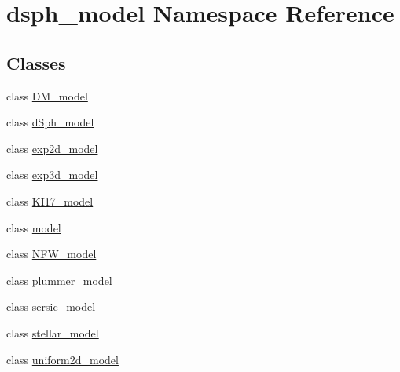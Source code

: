 \hypertarget{namespacedsph__model}{}\section{dsph\+\_\+model Namespace Reference}
\label{namespacedsph__model}
\subsection*{Classes}
\begin{DoxyCompactItemize}
\item 
class \hyperlink{classdsph__model_1_1DM__model}{D\+M\+\_\+model}
\item 
class \hyperlink{classdsph__model_1_1dSph__model}{d\+Sph\+\_\+model}
\item 
class \hyperlink{classdsph__model_1_1exp2d__model}{exp2d\+\_\+model}
\item 
class \hyperlink{classdsph__model_1_1exp3d__model}{exp3d\+\_\+model}
\item 
class \hyperlink{classdsph__model_1_1KI17__model}{K\+I17\+\_\+model}
\item 
class \hyperlink{classdsph__model_1_1model}{model}
\item 
class \hyperlink{classdsph__model_1_1NFW__model}{N\+F\+W\+\_\+model}
\item 
class \hyperlink{classdsph__model_1_1plummer__model}{plummer\+\_\+model}
\item 
class \hyperlink{classdsph__model_1_1sersic__model}{sersic\+\_\+model}
\item 
class \hyperlink{classdsph__model_1_1stellar__model}{stellar\+\_\+model}
\item 
class \hyperlink{classdsph__model_1_1uniform2d__model}{uniform2d\+\_\+model}
\end{DoxyCompactItemize}
